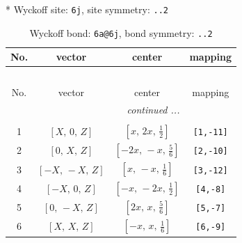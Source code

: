 \documentclass[fleqn,8pt]{jsarticle}
\begin{document}
* Wyckoff site: {\tt 6j}, site symmetry: {\tt ..2}
\renewcommand{\arraystretch}{1.2}
\begin{longtable}{cccc}
\caption{Wyckoff bond: {\tt 6a@6j}, bond symmetry: {\tt ..2}}
 \\
 \hline \hline
No. & vector & center & mapping \\ \hline \endfirsthead

\multicolumn{3}{l}{\tablename\ \thetable{}} \\
 \hline \hline
No. & vector & center & mapping \\ \hline \endhead

 \hline \hline
\multicolumn{3}{r}{\footnotesize\it continued ...} \\ \endfoot

 \hline \hline
\multicolumn{3}{r}{} \\ \endlastfoot

1 & $\left[ X,\, 0,\, Z \right]$ & $\left[ x,\, 2 x,\, \frac{1}{2} \right]$ & {\tt [1,-11]} \\ \hline
2 & $\left[ 0,\, X,\, Z \right]$ & $\left[ - 2 x,\, - x,\, \frac{5}{6} \right]$ & {\tt [2,-10]} \\ \hline
3 & $\left[ - X,\, - X,\, Z \right]$ & $\left[ x,\, - x,\, \frac{1}{6} \right]$ & {\tt [3,-12]} \\ \hline
4 & $\left[ - X,\, 0,\, Z \right]$ & $\left[ - x,\, - 2 x,\, \frac{1}{2} \right]$ & {\tt [4,-8]} \\ \hline
5 & $\left[ 0,\, - X,\, Z \right]$ & $\left[ 2 x,\, x,\, \frac{5}{6} \right]$ & {\tt [5,-7]} \\ \hline
6 & $\left[ X,\, X,\, Z \right]$ & $\left[ - x,\, x,\, \frac{1}{6} \right]$ & {\tt [6,-9]} \\
\end{longtable}
\renewcommand{\arraystretch}{1.2}
\end{document}

